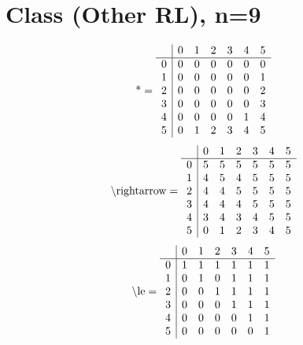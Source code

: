 \documentclass[11pt]{article}
\begin{document}
\section{Class (Other RL), n=9}
\[\text{*} = 
\begin{array}{r | r r r r r r}
 & 0 & 1 & 2 & 3 & 4 & 5 \\ \hline
0 & 0 & 0 & 0 & 0 & 0 & 0 \\
1 & 0 & 0 & 0 & 0 & 0 & 1 \\
2 & 0 & 0 & 0 & 0 & 0 & 2 \\
3 & 0 & 0 & 0 & 0 & 0 & 3 \\
4 & 0 & 0 & 0 & 0 & 1 & 4 \\
5 & 0 & 1 & 2 & 3 & 4 & 5 \\
\end{array}
\]
\[\text{\textbackslash rightarrow} = 
\begin{array}{r | r r r r r r}
 & 0 & 1 & 2 & 3 & 4 & 5 \\ \hline
0 & 5 & 5 & 5 & 5 & 5 & 5 \\
1 & 4 & 5 & 4 & 5 & 5 & 5 \\
2 & 4 & 4 & 5 & 5 & 5 & 5 \\
3 & 4 & 4 & 4 & 5 & 5 & 5 \\
4 & 3 & 4 & 3 & 4 & 5 & 5 \\
5 & 0 & 1 & 2 & 3 & 4 & 5 \\
\end{array}
\]
\[\text{\textbackslash le} = 
\begin{array}{r | r r r r r r}
 & 0 & 1 & 2 & 3 & 4 & 5 \\ \hline
0 & 1 & 1 & 1 & 1 & 1 & 1 \\
1 & 0 & 1 & 0 & 1 & 1 & 1 \\
2 & 0 & 0 & 1 & 1 & 1 & 1 \\
3 & 0 & 0 & 0 & 1 & 1 & 1 \\
4 & 0 & 0 & 0 & 0 & 1 & 1 \\
5 & 0 & 0 & 0 & 0 & 0 & 1 \\
\end{array}
\]
\end{document}

